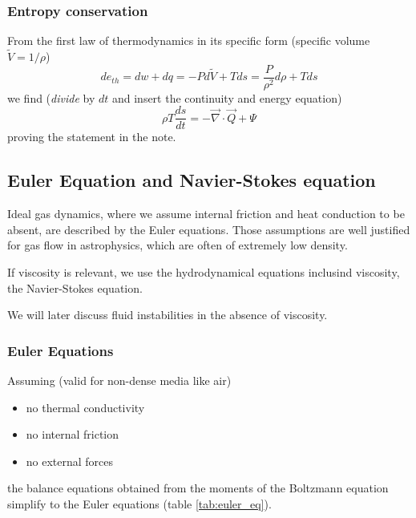 \subsubsection{Entropy conservation}
From the first law of thermodynamics in its specific form (specific volume $\tilde{V} = 1/\rho$)
\begin{equation}
    de_{th} = dw + dq = -P d\tilde{V} + Tds = \frac{P}{\rho^2} d\rho + T ds
\end{equation}
we find (\textit{divide} by $dt$ and insert the continuity and energy equation)
\begin{equation}
    \rho T \frac{ds}{dt} = -\vec{\nabla} \cdot \vec{Q} + \Psi
\end{equation}
proving the statement in the note.

\subsection{Euler Equation and Navier-Stokes equation}
\textcolor{blue1}{Ideal gas dynamics}, where we assume internal friction and heat conduction to be absent,
are described by the \textcolor{blue1}{Euler equations}. Those assumptions are well justified for gas flow
in astrophysics, which are often of extremely low density.

\textcolor{blue1}{If viscosity is relevant}, we use the hydrodynamical equations inclusind viscosity,
the \textcolor{blue1}{Navier-Stokes equation}.

We will later discuss fluid instabilities in the absence of viscosity.

\subsubsection{Euler Equations}
Assuming (\textcolor{green1}{valid for non-dense media like air})
\begin{itemize}
    \item no thermal conductivity
    \item no internal friction
    \item no external forces
\end{itemize}
the balance equations obtained from the moments of the Boltzmann equation simplify to the Euler
equations (table \ref{tab:euler_eq}).

